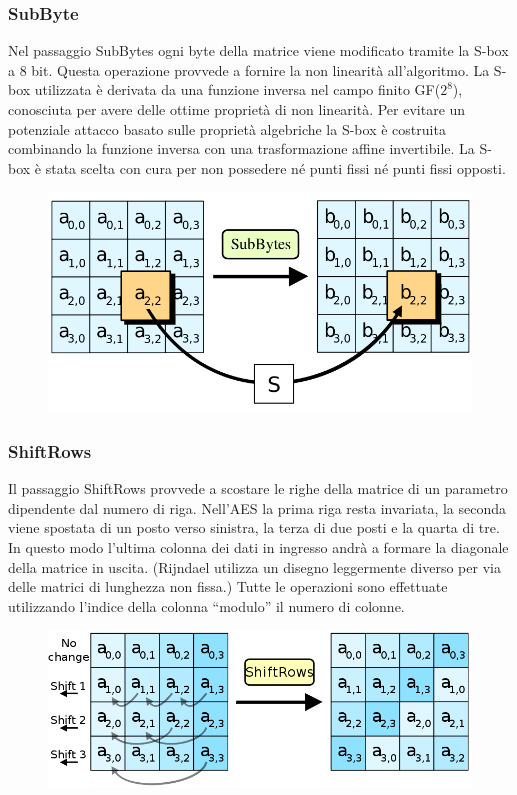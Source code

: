 \documentclass[10pt,a4paper]{article}
\begin{document}
\subsubsection{SubByte}
Nel passaggio SubBytes ogni byte della matrice viene modificato tramite la S-box a 8 bit. Questa operazione provvede a fornire la non linearità all'algoritmo. La S-box utilizzata è derivata da una funzione inversa nel campo finito GF($2^8$), conosciuta per avere delle ottime proprietà di non linearità. Per evitare un potenziale attacco basato sulle proprietà algebriche la S-box è costruita combinando la funzione inversa con una trasformazione affine invertibile. La S-box è stata scelta con cura per non possedere né punti fissi né punti fissi opposti.

\begin{figure}[htbp]
\includegraphics[scale=0.3]{immagini/SubBytes.png}
\end{figure}

\subsubsection{ShiftRows}
Il passaggio ShiftRows provvede a scostare le righe della matrice di un parametro dipendente dal numero di riga. Nell'AES la prima riga resta invariata, la seconda viene spostata di un posto verso sinistra, la terza di due posti e la quarta di tre. In questo modo l'ultima colonna dei dati in ingresso andrà a formare la diagonale della matrice in uscita. (Rijndael utilizza un disegno leggermente diverso per via delle matrici di lunghezza non fissa.)
Tutte le operazioni sono effettuate utilizzando l'indice della colonna “modulo” il numero di colonne.
\begin{figure}[htbp]
\includegraphics[scale=0.4]{immagini/ShiftRows.png}
\end{figure}
\end{document}
